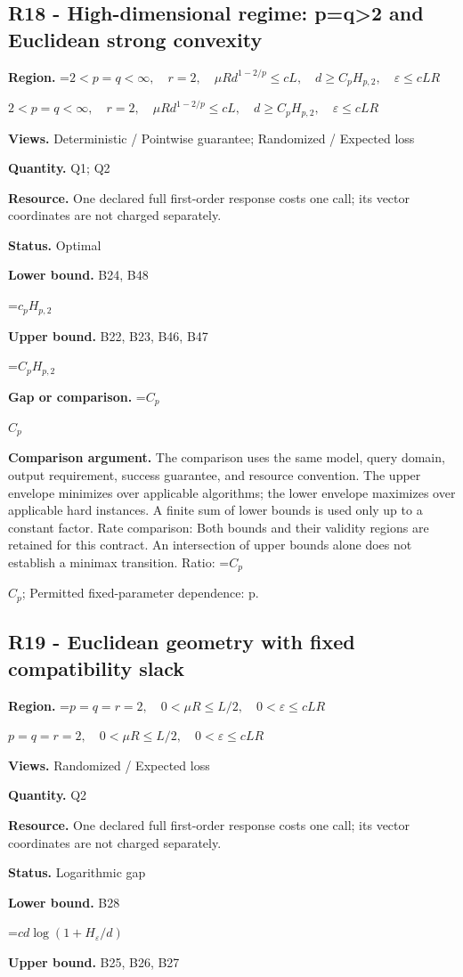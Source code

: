 \documentclass[10pt,a4paper]{article}
\newcommand{\AtlasMath}[1]{\par\begingroup\centering\setbox0=\hbox{$\displaystyle #1$}\ifdim\wd0>1.4\linewidth\typeout{ATLAS WIDE FORMULA: \the\wd0}\fi\ifdim\wd0>\linewidth\resizebox{\linewidth}{!}{\box0}\else\box0\fi\par\endgroup}
\newcommand{\AtlasInlineMath}[1]{\begingroup\setbox0=\hbox{$#1$}\ifdim\wd0>.4\linewidth\endgroup\AtlasMath{#1}\else\endgroup$#1$\fi}
\begin{document}
\subsection{R18 - High-dimensional regime: p=q>2 and Euclidean strong convexity}
\textbf{Region.} \AtlasInlineMath{2<p=q<\infty,\quad r=2,\quad\mu R d^{1-2/p}\le cL,\quad d\ge C_pH_{p,2},\quad\varepsilon\le cLR}

\textbf{Views.} Deterministic / Pointwise guarantee; Randomized / Expected loss

\textbf{Quantity.} Q1; Q2

\textbf{Resource.} One declared full first-order response costs one call; its vector coordinates are not charged separately.

\textbf{Status.} Optimal

\textbf{Lower bound.} B24, B48

\AtlasMath{c_pH_{p,2}}
\textbf{Upper bound.} B22, B23, B46, B47

\AtlasMath{C_pH_{p,2}}
\textbf{Gap or comparison.} \AtlasInlineMath{C_p}

\textbf{Comparison argument.} The comparison uses the same model, query domain, output requirement, success guarantee, and resource convention. The upper envelope minimizes over applicable algorithms; the lower envelope maximizes over applicable hard instances. A finite sum of lower bounds is used only up to a constant factor. Rate comparison: Both bounds and their validity regions are retained for this contract. An intersection of upper bounds alone does not establish a minimax transition. Ratio: \AtlasInlineMath{C_p}; Permitted fixed-parameter dependence: p.

\subsection{R19 - Euclidean geometry with fixed compatibility slack}
\textbf{Region.} \AtlasInlineMath{p=q=r=2,\quad0<\mu R\le L/2,\quad0<\varepsilon\le cLR}

\textbf{Views.} Randomized / Expected loss

\textbf{Quantity.} Q2

\textbf{Resource.} One declared full first-order response costs one call; its vector coordinates are not charged separately.

\textbf{Status.} Logarithmic gap

\textbf{Lower bound.} B28

\AtlasMath{cd\log(1+H_\varepsilon/d)}
\textbf{Upper bound.} B25, B26, B27
\end{document}
